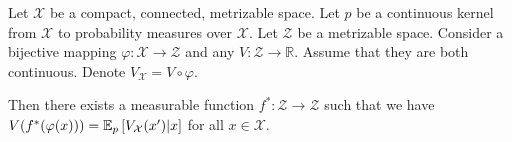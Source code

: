 \begin{lemma}
\label{lem:cvaml:deterministic_representation_lemma}
    Let $\mathcal{X}$ be a compact, connected, metrizable space. Let $p$ be a continuous kernel from $\mathcal{X}$ to probability measures over $\mathcal{X}$. Let $\mathcal{Z}$ be a metrizable space. Consider a bijective mapping $\varphi: \mathcal{X} \rightarrow \mathcal{Z}$ and any $V: \mathcal{Z} \rightarrow \mathbb{R}$. Assume that they are both continuous. Denote $V_\mathcal{X} = V \circ \varphi$.
    
    Then there exists a measurable function $f^*: \mathcal{Z} \rightarrow \mathcal{Z}$ such that we have $V(f^*(\varphi(x))) = \mathbb{E}_{p}\left[  V_\mathcal{X}(x')|x \right]$ for all $x \in \mathcal{X}$.
\end{lemma}

